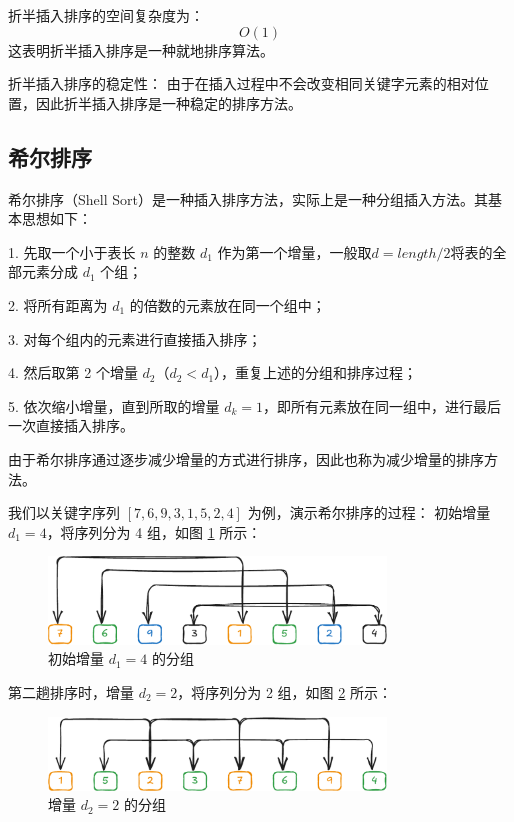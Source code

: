 \documentclass[lang=cn,newtx,10pt,scheme=chinese]{../elegantbook}
\begin{document}
折半插入排序的空间复杂度为：
\[
O(1)
\]
这表明折半插入排序是一种就地排序算法。

折半插入排序的稳定性：  
由于在插入过程中不会改变相同关键字元素的相对位置，因此折半插入排序是一种稳定的排序方法。

\subsection{希尔排序}
希尔排序（Shell Sort）是一种插入排序方法，实际上是一种分组插入方法。其基本思想如下：

1. 先取一个小于表长 $n$ 的整数 $d_1$ 作为第一个增量，一般取$d = length/2$将表的全部元素分成 $d_1$ 个组；

2. 将所有距离为 $d_1$ 的倍数的元素放在同一个组中；

3. 对每个组内的元素进行直接插入排序；

4. 然后取第 2 个增量 $d_2$（$d_2 < d_1$），重复上述的分组和排序过程；

5. 依次缩小增量，直到所取的增量 $d_k = 1$，即所有元素放在同一组中，进行最后一次直接插入排序。

由于希尔排序通过逐步减少增量的方式进行排序，因此也称为减少增量的排序方法。

我们以关键字序列 $[7,6,9,3,1,5,2,4]$ 为例，演示希尔排序的过程：
初始增量 $d_1 = 4$，将序列分为 4 组，如图 \ref{fig:shellSort1} 所示：
\begin{figure}[!htbp]
    \centering
    \includegraphics[width=0.8\textwidth]{./figure/pdf/cropped/shell(a).pdf}
    \caption{初始增量 $d_1 = 4$ 的分组}
    \label{fig:shellSort1}
\end{figure}

第二趟排序时，增量 $d_2 = 2$，将序列分为 2 组，如图 \ref{fig:shellSort2} 所示：
\begin{figure}[!htbp]
    \centering
    \includegraphics[width=0.8\textwidth]{./figure/pdf/cropped/shell(b).pdf}
    \caption{增量 $d_2 = 2$ 的分组}
    \label{fig:shellSort2}
\end{figure}
\end{document}
